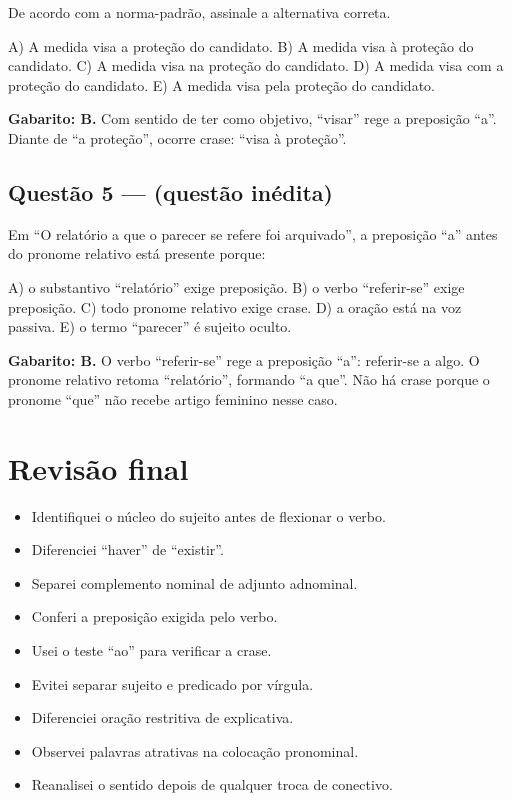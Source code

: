\documentclass[11pt,a4paper]{article}
\begin{document}
De acordo com a norma-padrão, assinale a alternativa correta.

A) A medida visa a proteção do candidato. B) A medida visa à proteção do candidato. C) A medida visa na proteção do candidato. D) A medida visa com a proteção do candidato. E) A medida visa pela proteção do candidato.

\begin{alerta}
\textbf{Gabarito: B.} Com sentido de ter como objetivo, “visar” rege a preposição “a”. Diante de “a proteção”, ocorre crase: “visa à proteção”.
\end{alerta}

\subsection*{Questão 5 — (questão inédita)}

Em “O relatório a que o parecer se refere foi arquivado”, a preposição “a” antes do pronome relativo está presente porque:

A) o substantivo “relatório” exige preposição. B) o verbo “referir-se” exige preposição. C) todo pronome relativo exige crase. D) a oração está na voz passiva. E) o termo “parecer” é sujeito oculto.

\begin{alerta}
\textbf{Gabarito: B.} O verbo “referir-se” rege a preposição “a”: referir-se a algo. O pronome relativo retoma “relatório”, formando “a que”. Não há crase porque o pronome “que” não recebe artigo feminino nesse caso.
\end{alerta}

\section*{Revisão final}

\begin{itemize}
  \item[$\square$] Identifiquei o núcleo do sujeito antes de flexionar o verbo.
  \item[$\square$] Diferenciei “haver” de “existir”.
  \item[$\square$] Separei complemento nominal de adjunto adnominal.
  \item[$\square$] Conferi a preposição exigida pelo verbo.
  \item[$\square$] Usei o teste “ao” para verificar a crase.
  \item[$\square$] Evitei separar sujeito e predicado por vírgula.
  \item[$\square$] Diferenciei oração restritiva de explicativa.
  \item[$\square$] Observei palavras atrativas na colocação pronominal.
  \item[$\square$] Reanalisei o sentido depois de qualquer troca de conectivo.
\end{itemize}
\end{document}
